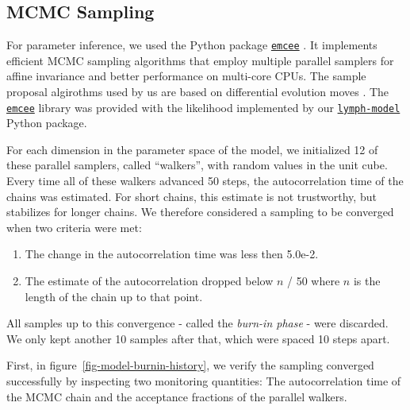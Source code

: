 \documentclass[
  sn-mathphys-num,
]{sn-jnl}
\providecommand{\tightlist}{%
  \setlength{\itemsep}{0pt}\setlength{\parskip}{0pt}}\usepackage{longtable,booktabs,array}
\begin{document}
\subsection{MCMC Sampling}\label{sec-sampling}

For parameter inference, we used the Python package
\href{https://emcee.readthedocs.io/en/stable/}{\texttt{emcee}}
\citep{foreman-mackey_emcee_2013}. It implements efficient MCMC sampling
algorithms that employ multiple parallel samplers for affine invariance
and better performance on multi-core CPUs. The sample proposal
algirothms used by us are based on differential evolution moves
\citep{ter_braak_differential_2008, nelson_run_2013}. The
\href{https://emcee.readthedocs.io/en/stable/}{\texttt{emcee}} library
was provided with the likelihood implemented by our
\href{https://lymph-model.readthedocs.io/en/stable/}{\texttt{lymph-model}}
Python package.

For each dimension in the parameter space of the model, we initialized
12 of these parallel samplers, called ``walkers'', with random values in
the unit cube. Every time all of these walkers advanced 50 steps, the
autocorrelation time of the chains was estimated. For short chains, this
estimate is not trustworthy, but stabilizes for longer chains. We
therefore considered a sampling to be converged when two criteria were
met:

\begin{enumerate}
\def\labelenumi{\arabic{enumi}.}
\tightlist
\item
  The change in the autocorrelation time was less then 5.0e-2.
\item
  The estimate of the autocorrelation dropped below \(n\) / 50 where
  \(n\) is the length of the chain up to that point.
\end{enumerate}

All samples up to this convergence - called the \emph{burn-in phase} -
were discarded. We only kept another 10 samples after that, which were
spaced 10 steps apart.

First, in figure~\ref{fig-model-burnin-history}, we verify the sampling
converged successfully by inspecting two monitoring quantities: The
autocorrelation time of the MCMC chain and the acceptance fractions of
the parallel walkers.
\end{document}
